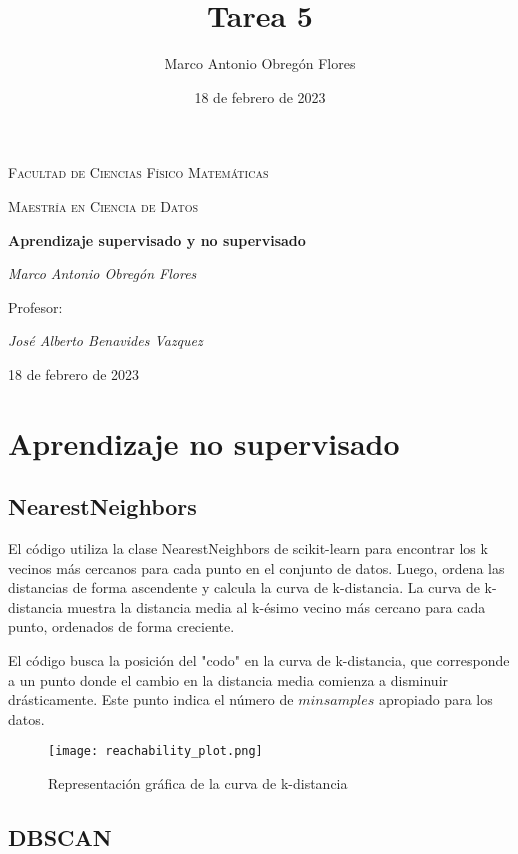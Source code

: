 \documentclass{article}
\title{Tarea 5}
\author{Marco Antonio Obregón Flores}
\date{18 de febrero de 2023}
\begin{document}
\begin{titlepage}
    \centering
    {\scshape\large Facultad de Ciencias Físico Matemáticas\par}
    {\scshape\large Maestría en Ciencia de Datos\par}
    \vspace{1cm}
    {\huge\bfseries Aprendizaje supervisado y no supervisado\par}
    \vspace{2cm}
    {\Large\itshape Marco Antonio Obregón Flores\par}
    \vfill
    {\large Profesor:\par}
    {\Large\itshape José Alberto Benavides Vazquez\par}
    \vspace{1cm}
    {\large 18 de febrero de 2023\par}
\end{titlepage}

\section{Aprendizaje no supervisado}
\subsection{NearestNeighbors}
\setlength{\parskip}{15pt}

El código utiliza la clase NearestNeighbors de scikit-learn para encontrar los k vecinos más cercanos para cada punto en el conjunto de datos. Luego, ordena las distancias de forma ascendente y calcula la curva de k-distancia. La curva de k-distancia muestra la distancia media al k-ésimo vecino más cercano para cada punto, ordenados de forma creciente.

El código busca la posición del "codo" en la curva de k-distancia, que corresponde a un punto donde el cambio en la distancia media comienza a disminuir drásticamente. Este punto indica el número de $min samples$
apropiado para los datos.

\begin{figure}[h]
\centering
\texttt{[image: reachability\_plot.png]}
\caption{Representación gráfica de la curva de k-distancia}
\label{fig:reachability_plot}
\end{figure}

\subsection{DBSCAN}
\end{document}

